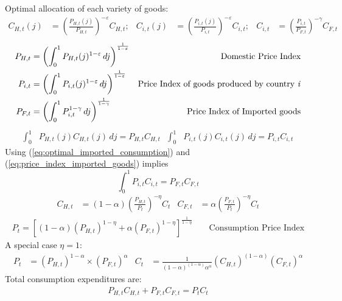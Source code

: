 \documentclass[12pt]{article}
\begin{document}
Optimal allocation of each variety of goods:
\begin{align}
    C_{H,t}(j) & = \left( \frac{P_{H,t}(j)}{P_{H,t}}\right)^{-\varepsilon}C_{H,t}; & C_{i,t}(j) & = \left( \frac{P_{i,t}(j)}{P_{i,t}}\right)^{-\varepsilon}C_{i,t}; & C_{i,t} & = \left( \frac{P_{i,t}}{P_{F,t}}\right)^{-\gamma}C_{F,t}\label{eq:optimal_imported_consumption}
\end{align}
\begin{align}
    P_{H,t} & = \left( \int_{0}^{1} P_{H,t}(j)^{1-\varepsilon} \,dj  \right)^{\frac{1}{1-\varepsilon}}                                  & \text{Domestic Price Index}                                \\
    P_{i,t} & = \left( \int_{0}^{1} P_{i,t}(j)^{1-\varepsilon} \,dj  \right)^{\frac{1}{1-\varepsilon}}                                  & \text{Price Index of goods produced by country \textit{i}} \\
    P_{F,t} & = \left( \int_{0}^{1} P_{i,t}^{1-\gamma} \,dj  \right)^{\frac{1}{1-\gamma}}         \label{eq:price_index_imported_goods} & \text{Price Index of Imported goods}
\end{align}
\begin{align}
    \int_{0}^{1} & P_{H,t}(j)C_{H,t}(j) \,dj = P_{H,t}C_{H,t} & \int_{0}^{1} & P_{i,t}(j)C_{i,t}(j) \,dj = P_{i,t}C_{i,t}
\end{align}
Using (\ref{eq:optimal_imported_consumption}) and (\ref{eq:price_index_imported_goods}) implies
\begin{equation}
    \int_{0}^{1} P_{i,t}C_{i,t} = P_{F,t}C_{F,t}
\end{equation}
\begin{align}
    C_{H,t} & = (1-\alpha) {\left(\frac{P_{H,t}}{P_t}\right)}^{-\eta} C_{t} & C_{F,t} & = \alpha {\left(\frac{P_{F,t}}{P_t}\right)}^{-\eta} C_{t}
\end{align}
\begin{align}
    P_t = \left[ (1-\alpha) (P_{H,t})^{1-\eta} + \alpha (P_{F,t})^{1-\eta} \right]^{\frac{1}{1-\eta}} &  & \text{ Consumption Price Index}
\end{align}
A special case $\eta=1$:
\begin{align}
    P_t & = (P_{H,t})^{1-\alpha} \times (P_{F,t})^{\alpha} & C_t & = \frac{1}{(1-\alpha)^{(1-\alpha)}\alpha^\alpha}(C_{H,t})^{(1-\alpha)}(C_{F,t})^\alpha
\end{align}
Total consumption expenditures are:
\begin{align}
    P_{H,t}C_{H,t} + P_{F,t}C_{F,t} = P_t C_t
\end{align}
\end{document}
